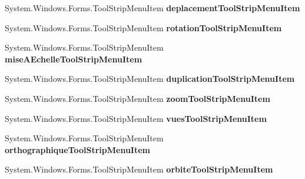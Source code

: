 \begin{DoxyCompactItemize}
\item 
System.\+Windows.\+Forms.\+Tool\+Strip\+Menu\+Item {\bfseries deplacement\+Tool\+Strip\+Menu\+Item}\hypertarget{class_interface_graphique_1_1_edition_a08c8c320debaccb37f8d10fbcbd19048}{}\label{class_interface_graphique_1_1_edition_a08c8c320debaccb37f8d10fbcbd19048}

\item 
System.\+Windows.\+Forms.\+Tool\+Strip\+Menu\+Item {\bfseries rotation\+Tool\+Strip\+Menu\+Item}\hypertarget{class_interface_graphique_1_1_edition_aba02af11f2a7eebc320140c33d705fd0}{}\label{class_interface_graphique_1_1_edition_aba02af11f2a7eebc320140c33d705fd0}

\item 
System.\+Windows.\+Forms.\+Tool\+Strip\+Menu\+Item {\bfseries mise\+A\+Echelle\+Tool\+Strip\+Menu\+Item}\hypertarget{class_interface_graphique_1_1_edition_a17a1ced0971cbd7c435ba2c460837471}{}\label{class_interface_graphique_1_1_edition_a17a1ced0971cbd7c435ba2c460837471}

\item 
System.\+Windows.\+Forms.\+Tool\+Strip\+Menu\+Item {\bfseries duplication\+Tool\+Strip\+Menu\+Item}\hypertarget{class_interface_graphique_1_1_edition_ac1ac117c18c587f3087fc3149a798ca8}{}\label{class_interface_graphique_1_1_edition_ac1ac117c18c587f3087fc3149a798ca8}

\item 
System.\+Windows.\+Forms.\+Tool\+Strip\+Menu\+Item {\bfseries zoom\+Tool\+Strip\+Menu\+Item}\hypertarget{class_interface_graphique_1_1_edition_a10a05c594d0c5134203bfd245c980eb7}{}\label{class_interface_graphique_1_1_edition_a10a05c594d0c5134203bfd245c980eb7}

\item 
System.\+Windows.\+Forms.\+Tool\+Strip\+Menu\+Item {\bfseries vues\+Tool\+Strip\+Menu\+Item}\hypertarget{class_interface_graphique_1_1_edition_a1a70c25712c9b56673d0229b1ea34ecd}{}\label{class_interface_graphique_1_1_edition_a1a70c25712c9b56673d0229b1ea34ecd}

\item 
System.\+Windows.\+Forms.\+Tool\+Strip\+Menu\+Item {\bfseries orthographique\+Tool\+Strip\+Menu\+Item}\hypertarget{class_interface_graphique_1_1_edition_aaccea1f223874b3327fa44194393a18e}{}\label{class_interface_graphique_1_1_edition_aaccea1f223874b3327fa44194393a18e}

\item 
System.\+Windows.\+Forms.\+Tool\+Strip\+Menu\+Item {\bfseries orbite\+Tool\+Strip\+Menu\+Item}\hypertarget{class_interface_graphique_1_1_edition_a85f53c861ab79e474a321e252a1eb5a5}{}\label{class_interface_graphique_1_1_edition_a85f53c861ab79e474a321e252a1eb5a5}


\end{DoxyCompactItemize}
